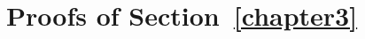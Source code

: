 \documentclass[runningheads]{llncs}
\theoremstyle{plain}
\theoremstyle{definition}
\begin{document}
    






\section{Proofs of Section~\ref{chapter3}}
\end{document}
